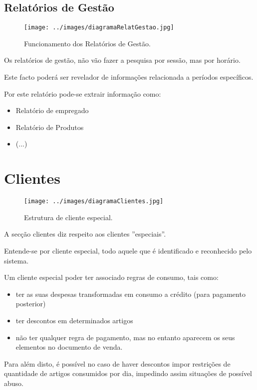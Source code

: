 \documentclass[a4paper,11pt,openany]{memoir}
\begin{document}
\subsection{Relatórios de Gestão}

\begin{figure}
\texttt{[image: ../images/diagramaRelatGestao.jpg]}
\caption[Submanifold]{Funcionamento dos Relatórios de Gestão.}
\end{figure}

Os relatórios de gestão, não vão fazer a pesquisa por sessão, mas por horário.

Este facto poderá ser revelador de informações relacionada a períodos específicos.

Por este relatório pode-se extrair informação como:
\begin{itemize}
\item Relatório de empregado
\item Relatório de Produtos
\item (...)
\end{itemize}


\newpage
\section{Clientes}

\begin{figure}
\texttt{[image: ../images/diagramaClientes.jpg]}
\caption[Submanifold]{Estrutura de cliente especial.}
\end{figure}


A secção clientes diz respeito aos clientes ''especiais''. 

Entende-se por cliente especial, todo aquele que é identificado e reconhecido pelo sistema. 

Um cliente especial poder ter associado regras de consumo, tais como:
\begin{itemize}
\item ter as suas despesas transformadas em consumo a crédito (para pagamento posterior)
\item ter descontos em determinados artigos
\item não ter qualquer regra de pagamento, mas no entanto aparecem os seus elementos no documento de venda.
\end{itemize}

Para além disto, é possível no caso de haver descontos impor restrições de quantidade de artigos consumidos
por dia, impedindo assim situações de possível abuso.
\end{document}
